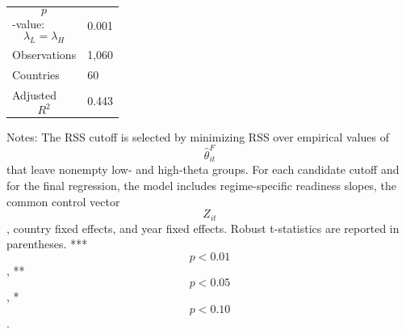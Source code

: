 \begin{table}[H]
\begin{threeparttable}
\begin{tabularx}{\textwidth}{lY}
$$p$$-value: $$\lambda_L=\lambda_H$$ & 0.001 \\
Observations & 1,060 \\
Countries & 60 \\
Adjusted $$R^2$$ & 0.443 \\
\bottomrule
\end{tabularx}
\begin{tablenotes}[flushleft]\footnotesize
\item Notes: The RSS cutoff is selected by minimizing RSS over empirical values of $$\widehat{\theta}^{F}_{it}$$ that leave nonempty low- and high-theta groups. For each candidate cutoff and for the final regression, the model includes regime-specific readiness slopes, the common control vector $$Z_{it}$$, country fixed effects, and year fixed effects. Robust t-statistics are reported in parentheses. *** $$p<0.01$$, ** $$p<0.05$$, * $$p<0.10$$.
\end{tablenotes}
\end{threeparttable}
\end{table}
